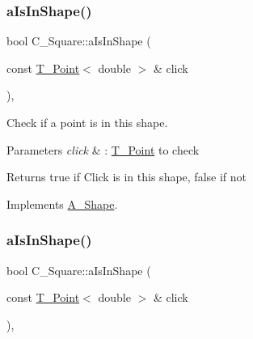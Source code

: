 \mbox{\label{classC__Square_ac5ffad4afca051f117b43012fb4dc239}} 
\subsubsection{\texorpdfstring{a\+Is\+In\+Shape()}{aIsInShape()}\hspace{0.1cm}{\footnotesize\ttfamily [1/2]}}
{\footnotesize\ttfamily bool C\+\_\+\+Square\+::a\+Is\+In\+Shape (\begin{DoxyParamCaption}\item[{const \hyperlink{classT__Point}{T\+\_\+\+Point}$<$ double $>$ \&}]{click }\end{DoxyParamCaption})\hspace{0.3cm}{\ttfamily [override]}, {\ttfamily [virtual]}}



Check if a point is in this shape. 


\begin{DoxyParams}{Parameters}
{\em click} & \+: \hyperlink{classT__Point}{T\+\_\+\+Point} to check \\
\hline
\end{DoxyParams}
\begin{DoxyReturn}{Returns}
true if Click is in this shape, false if not 
\end{DoxyReturn}


Implements \hyperlink{classA__Shape_a63f825cbc9780208d9a137f5c14917d0}{A\+\_\+\+Shape}.

\mbox{\label{classC__Square_ac5ffad4afca051f117b43012fb4dc239}} 
\subsubsection{\texorpdfstring{a\+Is\+In\+Shape()}{aIsInShape()}\hspace{0.1cm}{\footnotesize\ttfamily [2/2]}}
{\footnotesize\ttfamily bool C\+\_\+\+Square\+::a\+Is\+In\+Shape (\begin{DoxyParamCaption}\item[{const \hyperlink{classT__Point}{T\+\_\+\+Point}$<$ double $>$ \&}]{click }\end{DoxyParamCaption})\hspace{0.3cm}{\ttfamily [override]}, {\ttfamily [virtual]}}



